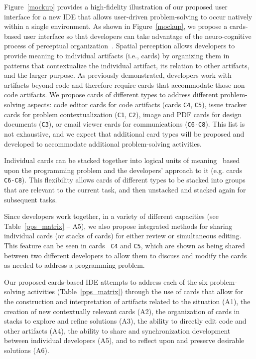 \documentclass{ppig}
\begin{document}
Figure~\ref{mockup} provides a high-fidelity illustration of our proposed user interface for a new IDE that allows user-driven problem-solving to occur natively within a single environment.
As shown in Figure~\ref{mockup}, we propose a cards-based user interface so that developers can take advantage of the neuro-cognitive process of perceptual organization~\cite{kimchi2003perceptual}.
Spatial perception allows developers to provide meaning to individual artifacts (i.e., cards) by organizing them in patterns that contextualize the individual artifact, its relation to other artifacts, and the larger purpose.
As previously demonstrated, developers work with artifacts beyond code and therefore require cards that accommodate those non-code artifacts.
We propose cards of different types to address different problem-solving aspects: code editor cards for code artifacts (cards \texttt{C4}, \texttt{C5}), issue tracker cards for problem contextualization (\texttt{C1}, \texttt{C2}), image and PDF cards for design documents (\texttt{C3}), or email viewer cards for communications (\texttt{C6-C8}).
This list is not exhaustive, and we expect that additional card types will be proposed and developed to accommodate additional problem-solving activities.

Individual cards can be stacked together into logical units of meaning~\cite{winslow1996programming} based upon the programming problem and the developers' approach to it (e.g. cards \texttt{C6-C8}).
This flexibility allows cards of different types to be stacked into groups that are relevant to the current task, and then unstacked and stacked again for subsequent tasks.

Since developers work together, in a variety of different capacities (see Table~\ref{pps_matrix} -- A5), we also propose integrated methods for sharing individual cards (or stacks of cards) for either review or simultaneous editing.
This feature can be seen in cards ~\texttt{C4} and \texttt{C5}, which are shown as being shared between two different developers to allow them to discuss and modify the cards as needed to address a programming problem.

Our proposed cards-based IDE attempts to address each of the six problem-solving activities (Table~\ref{pps_matrix}) through the use of cards that allow for the construction and interpretation of artifacts related to the situation (A1), the creation of new contextually relevant cards (A2), the organization of cards in stacks to explore and refine solutions (A3), the ability to directly edit code and other artifacts (A4), the ability to share and synchronization development between individual developers (A5), and to reflect upon and preserve desirable solutions (A6).


 
\end{document}
